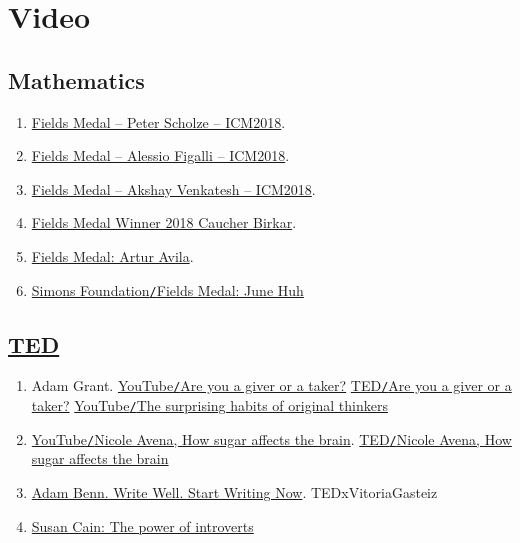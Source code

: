 \documentclass{article}
\begin{document}
\section{Video}

\subsection{Mathematics}

\begin{enumerate}
	\item \href{https://www.youtube.com/watch?v=yEVlCZTqht8}{Fields Medal -- Peter Scholze -- ICM2018}.
	\item \href{https://www.youtube.com/watch?v=G0rrnx8SaDI}{Fields Medal -- Alessio Figalli -- ICM2018}. 
	\item \href{https://www.youtube.com/watch?v=p7iXVQxvM00}{Fields Medal -- Akshay Venkatesh -- ICM2018}.
	\item \href{https://www.youtube.com/watch?v=mKLkzQqxmFE}{Fields Medal Winner 2018 Caucher Birkar}.
	\item \href{https://www.youtube.com/watch?v=yalkCpigHTA}{Fields Medal: Artur Avila}.
	\item \href{https://www.youtube.com/watch?v=yO8lQWb6TZ4}{Simons Foundation{\tt/}Fields Medal: June Huh}
\end{enumerate}

\subsection{\href{https://www.ted.com/}{TED}}

\begin{enumerate}
	\item {\sc Adam Grant.} \href{https://www.youtube.com/watch?v=YyXRYgjQXX0}{YouTube{\tt/}Are you a giver or a taker?} \href{https://www.ted.com/talks/adam_grant_are_you_a_giver_or_a_taker}{TED{\tt/}Are you a giver or a taker?} \href{https://www.youtube.com/watch?v=fxbCHn6gE3U}{YouTube{\tt/}The surprising habits of original thinkers}
	\item \href{https://www.youtube.com/watch?v=lEXBxijQREo}{YouTube{\tt/}Nicole Avena, How sugar affects the brain}. \href{https://ed.ted.com/lessons/how-sugar-affects-the-brain-nicole-avena}{TED{\tt/}Nicole Avena, How sugar affects the brain}
	\item \href{https://www.youtube.com/watch?v=KUKgJsvoDUk}{Adam Benn. Write Well. Start Writing Now}. TEDxVitoriaGasteiz
	\item \href{https://www.youtube.com/watch?v=c0KYU2j0TM4}{Susan Cain: The power of introverts}
\end{enumerate}
\end{document}
